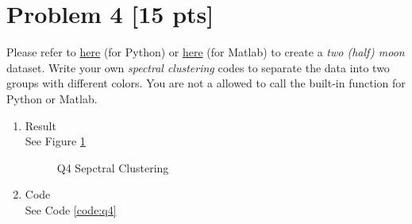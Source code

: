 \documentclass[11pt]{article}
\newcommand{\mfile}[1]  {{\small }} %
\begin{document}
\section*{Problem 4 [15 pts]}
Please refer to \href{https://shadow-ssml.readthedocs.io/en/latest/examples/halfmoons_example.html}{here} (for Python) or \href{https://github.com/jaejun-yoo/shallow-DANN-two-moon-dataset}{here} (for Matlab) to create a \textit{two (half) moon} dataset. Write your own \textit{spectral clustering} codes to separate the data into two groups with different colors.  You are not a allowed to call the built-in function for Python or Matlab.
\begin{enumerate}
	\item Result\\
		See Figure \ref{fig:Q4}
		\begin{figure}
			\centering
			\caption{Q4 Sepctral Clustering}
			\label{fig:Q4}
		  \end{figure} 
	\item Code\\
	See Code \ref{code:q4}
	\mfile{Q4.py}\label{code:q4}
	
\end{enumerate}
\newpage
\end{document}
